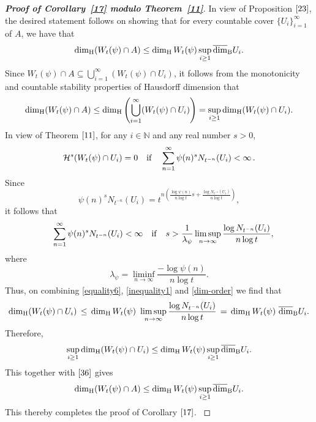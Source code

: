 \documentclass[12pt]{article}
\theoremstyle{definition}
\theoremstyle{remark}
\begin{document}
\begin{proof}[\rm \textbf{Proof of Corollary~\ref{17} modulo Theorem~\ref{11}}]  In view of Proposition $\ref{23}$, the desired statement  follows on  showing that for every countable cover $\{U_{i}\}_{i=1}^{\infty}$ of $A$, we have that 
$$\dim_{\rm H}(W_{t}(\psi)\cap A)\leq\dim_{\rm H}W_{t}(\psi)\sup_{i\geq1}\overline{\dim}_{\rm B}U_{i}.$$
Since $W_{t}(\psi)\cap A\subseteq\bigcup_{i=1}^{\infty}(W_{t}(\psi)\cap U_{i})$, it follows from the monotonicity and countable stability properties of Hausdorff dimension that
\begin{equation}\label{36}
\dim_{\rm H}(W_{t}(\psi)\cap A)\leq\dim_{\rm H}\left(\bigcup_{i=1}^{\infty}(W_{t}(\psi)\cap U_{i})\right)=\sup_{i\geq1}\dim_{\rm H}(W_{t}(\psi)\cap U_{i}).
\end{equation}
In view of Theorem $\ref{11}$, for any $i\in\mathbb{N}$ and any real number $s>0$,  
\begin{equation}\label{equality6}
\mathcal{H}^{s}(W_{t}(\psi)\cap U_{i})=0  \quad  {\rm if}  \quad  \sum\limits_{n=1}^{\infty}\psi(n)^{s}N_{t^{-n}}(U_{i})<\infty  \,. 
\end{equation} 
Since
$$\psi(n)^{s}N_{t^{-n}}(U_{i})=t^{n\left(\frac{\log\psi(n)}{n\log t}s+\frac{\log N_{t^{-n}}(U_{i})}{n\log t}\right)},$$
it follows that
\begin{equation}\label{inequality1} 
\quad  \sum\limits_{n=1}^{\infty}\psi(n)^{s}N_{t^{-n}}(U_{i})<\infty  \quad  {\rm if}\quad s>  \frac{1}{\lambda_\psi}\limsup_{n\to\infty}\frac{\log N_{t^{-n}}(U_{i})}{n\log t},
\end{equation}
where
$$ \lambda_\psi= \liminf_{n \to \infty}  \frac{- \log \psi(n)}{n \log t }.$$
Thus, on combining \eqref{equality6}, \eqref{inequality1} and  \eqref{dim-order} we find that
$$\dim_{\rm H}(W_{t}(\psi)\cap U_{i}) \,  \leq  \,  \dim_{\rm H}W_{t}(\psi) \ \limsup_{n\to\infty}\frac{\log N_{t^{-n}}(U_{i})}{n\log t}  \, =  \,   \dim_{\rm H}W_{t}(\psi)   \ \overline{\dim}_{\rm B}U_{i}.$$
Therefore,
$$\sup_{i\geq1}\dim_{\rm H}(W_{t}(\psi)\cap U_{i})\leq\dim_{\rm H}W_{t}(\psi)\sup_{i\geq1}\overline{\dim}_{\rm B}U_{i}.$$
This together with $\eqref{36}$ gives
$$\dim_{\rm H}(W_{t}(\psi)\cap A)\leq\dim_{\rm H}W_{t}(\psi)\sup_{i\geq1}\overline{\dim}_{\rm B}U_{i}.$$
This thereby completes the proof of Corollary $\ref{17}$.
\textrm{}
\end{proof}
\end{document}
